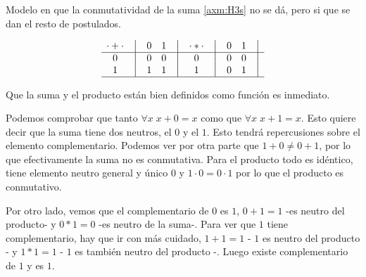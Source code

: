 \documentclass[final,12pt,a4paper,twoside,fleqn]{extbook}
\theoremstyle{definition}
\theoremstyle{remark}
\begin{document}
	Modelo en que la conmutatividad de la suma \ref{axm:H3s} no se dá, pero
si que se dan el resto de postulados.



\begin{equation}
    \begin{matrix}
        {\cdot + \cdot} & \big{\vert} & {0} & {1} & \big{\vert} \\
        \hline
        {0}             & \big{\vert} & {0} & {0} & \big{\vert} \\
        {1}             & \big{\vert} & {1} & {1} & \big{\vert} \\
        \hline
    \end{matrix}
    \quad
    \begin{matrix}
        {\cdot * \cdot} & \big{\vert} & {0} & {1} & \big{\vert} \\
        \hline
        {0}                   & \big{\vert} & {0} & {0} & \big{\vert} \\
        {1}                   & \big{\vert} & {0} & {1} & \big{\vert} \\
        \hline
    \end{matrix}
\end{equation}



	Que la suma y el producto están bien definidos como función es inmediato.



	Podemos comprobar que tanto \(\forall x \; x + 0 = x\) como que \(\forall
x \; x + 1 = x\). Esto quiere decir que la suma tiene dos neutros, el \(0\) y
el \(1\). Esto tendrá repercusiones sobre el elemento complementario. Podemos
ver por otra parte que \(1 + 0 \neq 0 + 1\), por lo que efectivamente la suma
no es conmutativa. Para el producto todo es idéntico, tiene elemento neutro
general y único \(0\) y \(1\cdot 0 = 0\cdot 1\) por lo que el producto es
conmutativo.



	Por otro lado, vemos que el complementario de \(0\) es \(1\), \(0 + 1 =
1\) -es neutro del producto- y \(0 * 1 = 0\) -es neutro de la suma-. Para ver
que \(1\) tiene complementario, hay que ir con más cuidado, \(1 + 1 = 1\) -
\(1\) es neutro del producto - y \(1 * 1 = 1\) - \(1\) es también neutro del
producto -. Luego existe complementario de \(1\) y es \(1\).
\end{document}
